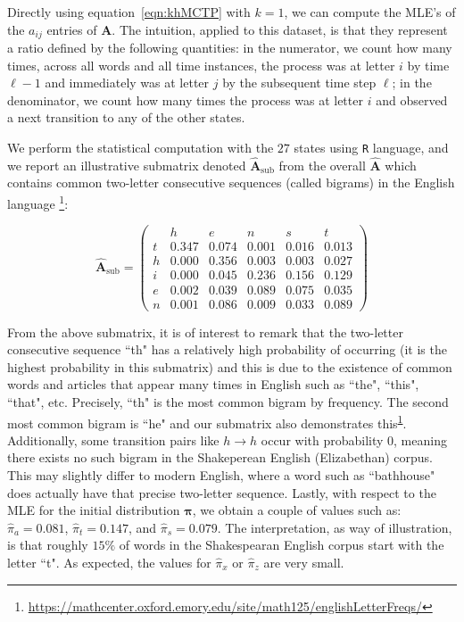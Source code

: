 \documentclass[11pt, a4paper]{article}
\numberwithin{equation}{section}
\theoremstyle{plain}
\theoremstyle{definition}
\begin{document}
Directly using equation~\eqref{eqn:khMCTP} with $k=1$, we can compute the MLE's of the $a_{ij}$ entries of $\mathbf{A}$. The intuition, applied to this dataset, is that they represent a ratio defined by the following quantities: in the numerator, we count how many times, across all words and all time instances, the process was at letter $i$ by time $\ell-1$ and immediately was at letter $j$ by the subsequent time step $\ell$; in the denominator, we count how many times the process was at letter $i$ and observed a next transition to any of the other states. 

We perform the statistical computation with the $27$ states using \texttt{R} language, and we report an illustrative submatrix denoted $\hat{\mathbf{A}}_{\text{sub}}$ from the overall $\hat{\mathbf{A}}$ which contains common two-letter consecutive sequences (called bigrams) in the English language \footnote{\url{https://mathcenter.oxford.emory.edu/site/math125/englishLetterFreqs/}\label{website_bigrams}}: 

\[ \hat{\mathbf{A}}_{\text{sub}}=
\left(
\begin{array}{c|ccccc}
      & h     & e     & n     & s     & t \\
\hline
t & 0.347 & 0.074 & 0.001 & 0.016 & 0.013 \\
h & 0.000 & 0.356 & 0.003 & 0.003 & 0.027 \\
i & 0.000 & 0.045 & 0.236 & 0.156 & 0.129 \\
e & 0.002 & 0.039 & 0.089 & 0.075 & 0.035 \\
n & 0.001 & 0.086 & 0.009 & 0.033 & 0.089
\end{array}
\right)
\]

From the above submatrix, it is of interest to remark that the two-letter consecutive sequence ``th" has a relatively high probability of occurring (it is the highest probability in this submatrix) and this is due to the existence of common words and articles that appear many times in English such as ``the", ``this", ``that", etc. Precisely, ``th" is the most common bigram by frequency. The second most common bigram is ``he" and our submatrix also demonstrates this\textsuperscript{\ref{website_bigrams}}. Additionally, some transition pairs like $h\rightarrow h$ occur with probability $0$, meaning there exists no such bigram in the Shakeperean English (Elizabethan) corpus. This may slightly differ to modern English, where a word such as ``bathhouse" does actually have that precise two-letter sequence. Lastly, with respect to the MLE for the initial distribution $\boldsymbol{\pi}$, we obtain a couple of values such as: $\hat{\pi}_a =0.081$, $\hat{\pi}_t=0.147$, and $\hat{\pi}_s = 0.079$. The interpretation, as way of illustration, is that roughly $15\%$ of words in the Shakespearan English corpus start with the letter ``t".  As expected, the values for $\hat{\pi}_x$ or $\hat{\pi}_z$ are very small.
\end{document}
